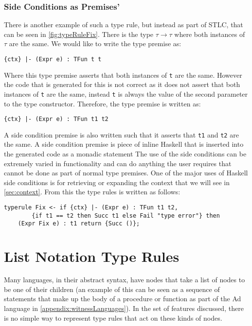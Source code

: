 \subsubsection{Side Conditions as Premises'}
\label{sec:scond}
There is another example of such a type rule, but instead as part of STLC, that can be seen in \autoref{fig:typeRuleFix}.
There is the type $\tau \rightarrow \tau$ where both instances of $\tau$ are the same.
We would like to write the type premise as:
\begin{lstlisting}[numbers=none]
{ctx} |- (Expr e) : TFun t t
\end{lstlisting}
Where this type premise asserts that both instances of \texttt{t} are the same.
However the code that is generated for this is not correct as it does not assert that both instances of \texttt{t} are the same, instead \texttt{t} is always the value of the second parameter to the type constructor.
Therefore, the type premise is written as:
\begin{lstlisting}[numbers=none]
{ctx} |- (Expr e) : TFun t1 t2
\end{lstlisting}
A side condition premise is also written such that it asserts that \texttt{t1} and \texttt{t2} are the same.
A side condition premise is piece of inline Haskell that is inserted into the generated code as a monadic statement
The use of the side conditions can be extremely varied in functionality and can do anything the user requires that cannot be done as part of normal type premises.
One of the major uses of Haskell side conditions is for retrieving or expanding the context that we will see in \autoref{sec:context}.
From this the type rules is written as follows:
\begin{lstlisting}
typerule Fix <- if {ctx} |- (Expr e) : TFun t1 t2, 
        {if t1 == t2 then Succ t1 else Fail "type error"} then 
    (Expr Fix e) : t1 return {Succ ()};
\end{lstlisting}

\section{List Notation Type Rules}
Many languages, in their abstract syntax, have nodes that take a list of nodes to be one of their children (an example of this can be seen as a sequence of statements that make up the body of a procedure or function as part of the Ad language in \autoref{appendix:witnessLanguages}).
In the set of features discussed, there is no simple way to represent type rules that act on these kinds of nodes.

